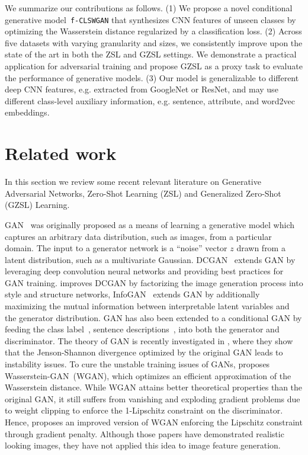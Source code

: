 \documentclass[10pt,twocolumn,letterpaper]{article}
\newcommand{\myparagraph}[1]{\vspace{6pt}\noindent{\bf #1}}
\begin{document}
We summarize our contributions as follows.
(1) We propose a novel conditional generative model~\texttt{f-CLSWGAN} that synthesizes CNN features of unseen classes by optimizing the Wasserstein distance regularized by a classification loss. 
(2) Across five datasets with varying granularity and sizes, we consistently improve upon the state of the art in both the ZSL and GZSL settings. We demonstrate a practical application for adversarial training and propose GZSL as a proxy task to evaluate the performance of generative models.
(3) Our model is generalizable to different deep CNN features, e.g. extracted from GoogleNet or ResNet, and may use different class-level auxiliary information, e.g. sentence, attribute, and word2vec embeddings. 



\section{Related work}


In this section we review some recent relevant literature on Generative Adversarial Networks, Zero-Shot Learning (ZSL) and Generalized Zero-Shot (GZSL) Learning.

\myparagraph{Generative Adversarial Network.} GAN~\cite{GPMXWDOCB14}
was originally proposed as a means of learning a generative model
which captures an arbitrary data distribution,
such as images, from a particular domain.
The input to a generator network is a ``noise'' vector $z$ drawn from a latent distribution, such as a multivariate Gaussian.
DCGAN~\cite{RMC16} extends GAN by leveraging deep convolution neural networks and providing best practices for GAN training. \cite{WG16} improves DCGAN by factorizing the image generation process into style and structure networks, InfoGAN~\cite{infogan} extends GAN by additionally maximizing the mutual information between interpretable latent variables and the generator distribution. 
GAN has also been extended to a  conditional GAN by feeding the class label~\cite{conditionalgans}, sentence descriptions~\cite{RAMSSL16,RAYLSL16,han2017stackgan}, into both the generator and discriminator. The theory of GAN is recently investigated in \cite{arjovsky2017towards,arjovsky2017wasserstein, gulrajani2017improved}, where they show that the Jenson-Shannon divergence optimized by the original GAN leads to instability issues. To cure the unstable training issues of GANs, \cite{arjovsky2017wasserstein} proposes Wasserstein-GAN~(WGAN), which optimizes an efficient approximation of the Wasserstein distance. While WGAN attains better theoretical properties than the original GAN, it still suffers from vanishing and exploding gradient problems due to weight clipping to enforce the 1-Lipschitz constraint on the discriminator. Hence, \cite{gulrajani2017improved} proposes an improved version of WGAN enforcing the Lipschitz constraint through gradient penalty. Although those papers have demonstrated realistic looking images, they have not applied this idea to image feature generation. 
\end{document}
